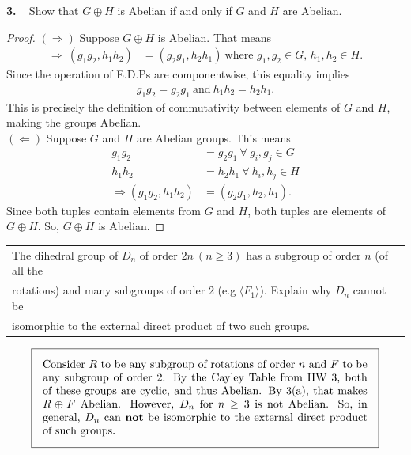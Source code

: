 \documentclass[12pt, letterpaper]{article}
\begin{document}
\vspace{0.2em} 
\noindent \textbf{3.} \  Show that $G \oplus H$ is Abelian if and only if $G$ and $H$ are Abelian.
\begin{proof}
    $(\Rightarrow)$ Suppose $G \oplus H$ is Abelian. That means
    \begin{align*}
        \Rightarrow \ (g_1g_2, h_1h_2) &= (g_2g_1, h_2h_1) \ \text{where $g_1,g_2 \in G$, $h_1,h_2 \in H$}. 
    \end{align*}
    Since the operation of E.D.Ps are componentwise, this equality implies
    \begin{align*}
        g_1g_2 = g_2g_1 \ \text{and} \ h_1h_2 = h_2h_1.
    \end{align*}
    This is precisely the definition of commutativity between elements of $G$ and $H$, making the groups Abelian. \\
    $(\Leftarrow)$ Suppose $G$ and $H$ are Abelian groups. This means
    \begin{align*}
        g_1g_2 &= g_2g_1 \ \forall \ g_i, g_j \in G \\
        h_1h_2 &= h_2h_1 \ \forall \ h_i, h_j \in H \\ 
        \Rightarrow (g_1g_2, h_1h_2) &= (g_2g_1, h_2, h_1).
    \end{align*}
    Since both tuples contain elements from $G$ and $H$, both tuples are elements of $G \oplus H$. So, $G \oplus H$ is Abelian.
\end{proof} \vspace{0.2em}
 \begin{tabular} [t] {l}
     The dihedral group of $D_n$ of order $2n \ (n \geq 3)$ has a subgroup of order $n$ (of all the \\
      rotations) and many subgroups of order $2$ (e.g $\langle F_1 \rangle$). Explain why $D_n$ cannot be \\
      isomorphic to the external direct product of two such groups.
\end{tabular} 
\begin{center}
\[
{\setlength{\fboxsep}{10pt}
\boxed{
    \parbox{0.85\linewidth}{
        Consider $R$ to be any subgroup of rotations of order $n$ and $F$ to be any subgroup of order 2. By the Cayley Table from HW $3$, both of these groups are cyclic, and thus Abelian.
         By 3(a), that makes $R \oplus F$ Abelian. However, $D_n$ for $n \geq 3$ is not Abelian. So, in general, $D_n$ can \textbf{not} be isomorphic to the
        external direct product of such groups.
    }
}}
\]
\end{center} \vspace{0.2em} 
\end{document}
